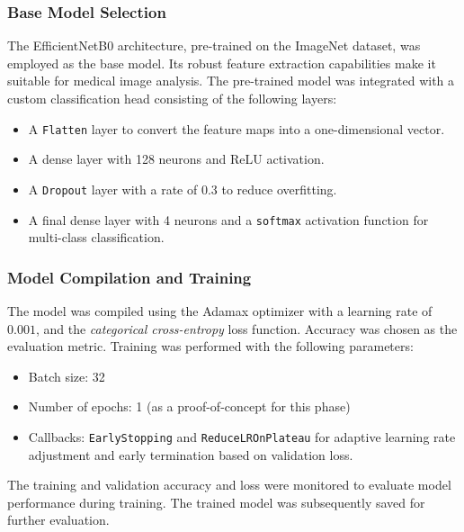 \documentclass[12pt,onecolumn]{report}
\begin{document}
\subsubsection{Base Model Selection}
The EfficientNetB0 architecture, pre-trained on the ImageNet dataset, was employed as the base model. Its robust feature extraction capabilities make it suitable for medical image analysis. The pre-trained model was integrated with a custom classification head consisting of the following layers:
\begin{itemize}
    \item A \texttt{Flatten} layer to convert the feature maps into a one-dimensional vector.
    \item A dense layer with 128 neurons and ReLU activation.
    \item A \texttt{Dropout} layer with a rate of 0.3 to reduce overfitting.
    \item A final dense layer with 4 neurons and a \texttt{softmax} activation function for multi-class classification.
\end{itemize}

\subsubsection{Model Compilation and Training}
The model was compiled using the Adamax optimizer with a learning rate of \(0.001\), and the \textit{categorical cross-entropy} loss function. Accuracy was chosen as the evaluation metric. Training was performed with the following parameters:
\begin{itemize}
    \item Batch size: 32
    \item Number of epochs: 1 (as a proof-of-concept for this phase)
    \item Callbacks: \texttt{EarlyStopping} and \texttt{ReduceLROnPlateau} for adaptive learning rate adjustment and early termination based on validation loss.
\end{itemize}

The training and validation accuracy and loss were monitored to evaluate model performance during training. The trained model was subsequently saved for further evaluation.
\end{document}
